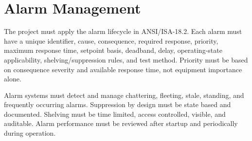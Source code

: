 \section{Alarm Management}
The project must apply the alarm lifecycle in ANSI/ISA-18.2. Each alarm must have a unique identifier, cause, consequence, required response, priority, maximum response time, setpoint basis, deadband, delay, operating-state applicability, shelving/suppression rules, and test method. Priority must be based on consequence severity and available response time, not equipment importance alone.

Alarm systems must detect and manage chattering, fleeting, stale, standing, and frequently occurring alarms. Suppression by design must be state based and documented. Shelving must be time limited, access controlled, visible, and auditable. Alarm performance must be reviewed after startup and periodically during operation.
